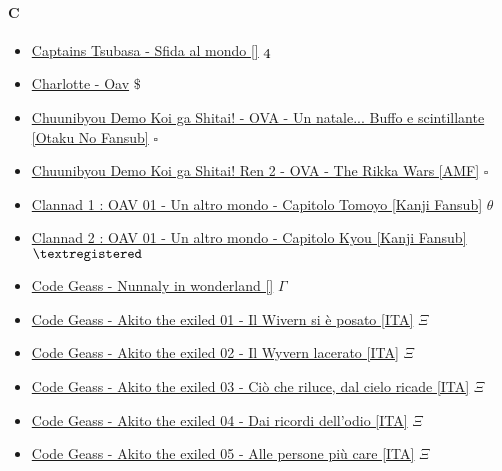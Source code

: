 		\paragraph{C} \hypertarget{OC}{}
			\begin{itemize}
				
				\item \href{https://mega.nz/#F!yLRlyB4T!7tT7jj8HJa2eY0MMfmtPKw} {Captains Tsubasa - Sfida al mondo []}  $\oldstylenums{4}$ \\
				\item \href{https://mega.nz/#!TD5QGSrL!Ig-EPYzpA17ctf8qGeS-czJoUd25YtQIezzSPMK6Erk} {Charlotte - Oav}  $\$$ \\
				\item \href{https://mega.nz/#!n8kQ0TRK!XZW5lbQwKMdWbPO8uIW_HyUnv9ELVqohWp6irH4a_M8} {Chuunibyou Demo Koi ga Shitai! - OVA - Un natale... Buffo e scintillante [Otaku No Fansub]}  $\square$ \\ 
				\item \href{https://mega.nz/#!al9HlZIb!I4c2rUX1hW-KLXbAoAb7yfoCQdZ2RbmTrffsTn7clL4} {Chuunibyou Demo Koi ga Shitai! Ren 2 - OVA - The Rikka Wars [AMF]}  $\square$ \\ 
				\item \href{https://mega.nz/#!R81BzDBb!OzIYHjfzXLp0M4S7VS9V__-46u7v3BEZ4HCYKp1Cxv0} {Clannad 1 : OAV 01 - Un altro mondo - Capitolo Tomoyo [Kanji Fansub]}  $\theta$ \\ 
				\item \href{https://mega.nz/#!ivRDnIyC!AJsHdVelljRVF_RYsPtWf5PxmfkxBjdyc3TMEOc6_4E} {Clannad 2 : OAV 01 - Un altro mondo - Capitolo Kyou [Kanji Fansub]}  $\textregistered$ 
				\item \href{https://mega.nz/#!U9FyzJrY!nqCFNXaHlm6tpC5v8QUaR6i5TP9fr1qgzrCc_OCe75c} {Code Geass - Nunnaly in wonderland []}  $\Gamma$ 
				\item \href{https://mega.nz/#!5K510QTJ!ydUTf2RH0CWqeyVcmN6Q_cyKFY0uAVobMmOaS2iD_pA} {Code Geass - Akito the exiled 01 - Il Wivern si è posato [ITA]}  $\Xi$ 
				\item \href{https://mega.nz/#!dGA3FR6K!kYhRZMQf4CjhityRu93Iy7yeH9qUseco2-4Y8P9183A} {Code Geass - Akito the exiled 02 - Il Wyvern lacerato  [ITA]}  $\Xi$ 
				\item \href{https://mega.nz/#!RHxRwDKB!qySVJR1DptJjy4Y3QsXaVO5hgHvqpSWuVNFmISPVeCM} {Code Geass - Akito the exiled 03 - Ciò che riluce, dal cielo ricade  [ITA]}  $\Xi$ 
				\item \href{https://mega.nz/#!hKxUHaZT!KuJTEFMB0tnlYtoQ8sMd8E4s6ewzXj1g8-rJQm59X_E} {Code Geass - Akito the exiled 04 - Dai ricordi dell'odio  [ITA]}  $\Xi$ 
				\item \href{https://mega.nz/#!NSxWVALK!KGtk5FU79MP-5NeU_IzTiVha7jUT3YGZ2M2R6MgIZcE} {Code Geass - Akito the exiled 05 - Alle persone più care [ITA]}  $\Xi$ 
				 	
			\end{itemize}	
			
